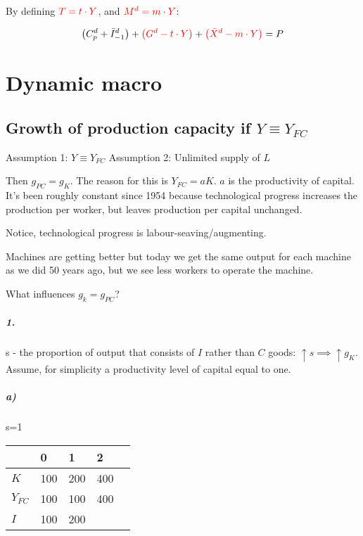 \documentclass{report}
\begin{document}
By defining $\textcolor{red}{T=t\cdot Y}$, and $\textcolor{red}{M^d=m\cdot Y}$:

\begin{equation}
    \big(C^d_p+\bar{I}^d_{-1} \big)+\textcolor{red}{\big(G^d-t\cdot Y \big)}+\textcolor{red}{\big(\bar{X}^d-m\cdot Y \big)}=P
\end{equation}


\chapter{Dynamic macro}

\section{Growth of production capacity if $Y \equiv Y_{FC}$}

Assumption 1: $Y \equiv Y_{FC}$
Assumption 2: Unlimited supply of $L$

Then $g_{PC} = g_K$. The reason for this is $Y_{FC} = aK$. $a$ is the productivity of capital. It's been roughly constant since 1954 because technological progress increases the production per worker, but leaves production per capital unchanged. 

Notice, technological progress is labour-seaving/augmenting. 

Machines are getting better but today we get the same output for each machine as we did 50 years ago, but we see less workers to operate the machine. 

What influences $g_k=g_{PC}$? 

\paragraph{1.} s - the proportion of output that consists of $I$ rather than $C$ goods: $\uparrow s \implies \uparrow g_K$. Assume, for simplicity a productivity level of capital equal to one. 

\paragraph{a)} s=1 
\begin{table}[H]
\centering

\begin{tabular}{|l|l|l|l|l|}
\hline
          & 0   & 1   & 2  \\ \hline
$K$         & 100 & 200 & 400  \\ \hline
$Y_{FC}$ & 100 & 100 & 400 \\ \hline
$I$         & 100 & 200 &  \\ \hline
\end{tabular}
\end{table}
\end{document}
